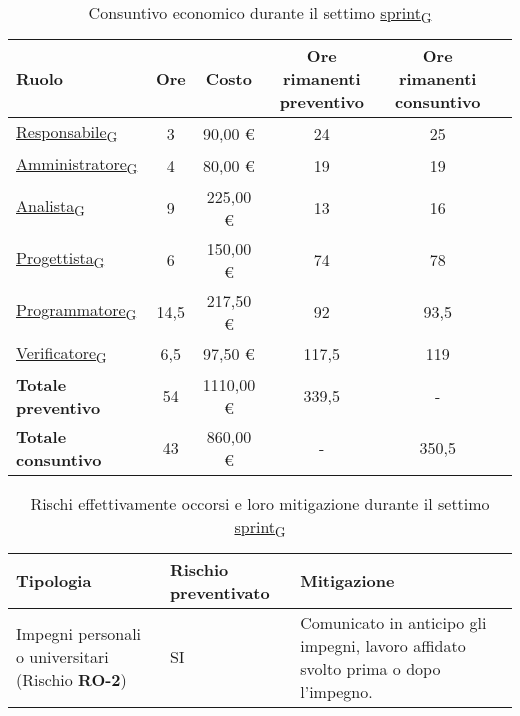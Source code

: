 \begin{table}[!h]
    \centering
    \begin{tabular}{ | l | c | c | c | c | c | }
        \hline
        \textbf{Ruolo} & \textbf{Ore} & \textbf{Costo} & \textbf{Ore rimanenti preventivo} & \textbf{Ore rimanenti consuntivo} \\
        \hline
        \href{https://7last.github.io/docs/pb/documentazione-interna/glossario\#responsabile}{Responsabile\textsubscript{G}}           &  3    &     90,00 € &  24   &  25   \\
        \href{https://7last.github.io/docs/pb/documentazione-interna/glossario\#amministratore}{Amministratore\textsubscript{G}}       &  4    &     80,00 € &  19   &  19   \\
        \href{https://7last.github.io/docs/pb/documentazione-interna/glossario\#analista}{Analista\textsubscript{G}}                   &  9    &    225,00 € &  13   &  16   \\
        \href{https://7last.github.io/docs/pb/documentazione-interna/glossario\#progettista}{Progettista\textsubscript{G}}             &  6    &    150,00 € &  74   &  78   \\
        \href{https://7last.github.io/docs/pb/documentazione-interna/glossario\#programmatore}{Programmatore\textsubscript{G}}         & 14,5  &    217,50 € &  92   &  93,5 \\
        \href{https://7last.github.io/docs/pb/documentazione-interna/glossario\#verificatore}{Verificatore\textsubscript{G}}           &  6,5  &     97,50 € & 117,5 & 119   \\
        \hline
        \textbf{Totale preventivo} &  54   &    1110,00 € &   339,5   &   -   \\
        \hline
        \textbf{Totale consuntivo} &  43   &     860,00 € &   -   &   350,5   \\
        \hline
    \end{tabular}
    \caption{Consuntivo economico durante il settimo \href{https://7last.github.io/docs/pb/documentazione-interna/glossario\#sprint}{sprint\textsubscript{G}}}

\end{table}

\begin{table}[!h]
    \centering
    \begin{tabular}{ | p{6cm} | p{2.5cm} | p{7.5cm} | }
        \hline
        \textbf{Tipologia} & \textbf{Rischio preventivato} & \textbf{Mitigazione}  \\
        \hline
        Impegni personali o universitari (Rischio \textbf{RO-2})& SI & Comunicato in anticipo gli impegni, lavoro affidato svolto prima o dopo l’impegno. \\
        \hline
    \end{tabular}
    \caption{Rischi effettivamente occorsi e loro mitigazione durante il settimo \href{https://7last.github.io/docs/pb/documentazione-interna/glossario\#sprint}{sprint\textsubscript{G}}}
\end{table}

